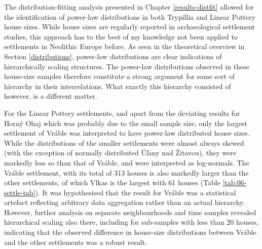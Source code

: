 \documentclass[
  12pt,
  a4paper, twoside]{book}
\begin{document}
The distribution-fitting analysis presented in Chapter \ref{results-distfit} allowed for the identification of power-law distributions in both Trypillia and Linear Pottery house sizes. While house sizes are regularly reported in archaeological settlement studies, this approach has to the best of my knowledge not been applied to settlements in Neolithic Europe before. As seen in the theoretical overview in Section \ref{distributions}, power-law distributions are clear indications of hierarchically scaling structures. The power-law distributions observed in these house-size samples therefore constitute a strong argument for some sort of hierarchy in their interrelations. What exactly this hierarchy consisted of however, is a different matter.

For the Linear Pottery settlements, and apart from the deviating results for Horný Ohaj which was probably due to the small sample size, only the largest settlement of Vráble was interpreted to have power-law distributed house sizes. While the distributions of the smaller settlements were almost always skewed (with the exception of normally distributed Úľany nad Žitavou), they were markedly less so than that of Vráble, and were interpreted as log-normals. The Vráble settlement, with its total of 313 houses is also markedly larger than the other settlements, of which Vlkas is the largest with 61 houses (Table \ref{tab:06-settle-tab}). It was hypothesised that the result for Vráble was a statistical artefact reflecting arbitrary data aggregation rather than an actual hierarchy. However, further analysis on separate neighbourhoods and time samples revealed hierarchical scaling also there, including for sub-samples with less than 20 houses, indicating that the observed difference in house-size distributions between Vráble and the other settlements was a robust result.
\end{document}
